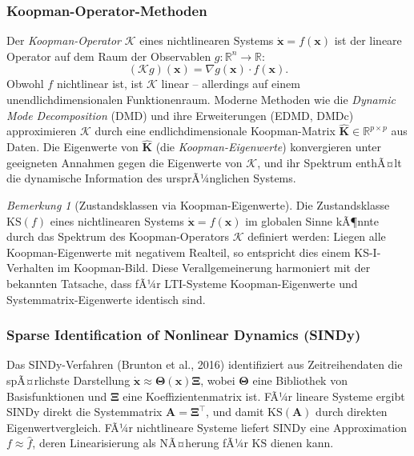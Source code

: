 ﻿\documentclass[12pt, a4paper, titlepage]{report}
\theoremstyle{definition}
\theoremstyle{remark}
\newtheorem{remark}[theorem]{Bemerkung}
\newcommand{\R}{\mathbb{R}}
\newcommand{\vx}{\bm{x}}
\newcommand{\vA}{\bm{A}}
\newcommand{\vK}{\bm{K}}
\newcommand{\T}{\top}
\newcommand{\KS}{\mathrm{KS}}
\begin{document}
\subsubsection*{Koopman-Operator-Methoden}

Der \emph{Koopman-Operator} $\mathcal{K}$ eines nichtlinearen Systems
$\dot{\vx} = f(\vx)$ ist der lineare Operator auf dem Raum der Observablen
$g : \R^n \to \R$:
\begin{equation}
  (\mathcal{K} g)(\vx) = \nabla g(\vx) \cdot f(\vx).
  \label{eq:koopman}
\end{equation}
Obwohl $f$ nichtlinear ist, ist $\mathcal{K}$ linear -- allerdings auf einem
unendlichdimensionalen Funktionenraum. Moderne Methoden wie die \emph{Dynamic Mode
Decomposition} (DMD) und ihre Erweiterungen (EDMD, DMDc) approximieren $\mathcal{K}$
durch eine endlichdimensionale Koopman-Matrix $\hat{\vK} \in \R^{p \times p}$
aus Daten. Die Eigenwerte von $\hat{\vK}$ (die \emph{Koopman-Eigenwerte}) konvergieren
unter geeigneten Annahmen gegen die Eigenwerte von $\mathcal{K}$, und ihr Spektrum
enthÃ¤lt die dynamische Information des ursprÃ¼nglichen Systems.

\begin{remark}[Zustandsklassen via Koopman-Eigenwerte]
Die Zustandsklasse $\KS(f)$ eines nichtlinearen Systems $\dot{\vx} = f(\vx)$ im globalen
Sinne kÃ¶nnte durch das Spektrum des Koopman-Operators $\mathcal{K}$ definiert werden:
Liegen alle Koopman-Eigenwerte mit negativem Realteil, so entspricht dies einem
KS-I-Verhalten im Koopman-Bild. Diese Verallgemeinerung harmoniert mit der
bekannten Tatsache, dass fÃ¼r LTI-Systeme Koopman-Eigenwerte und Systemmatrix-Eigenwerte
identisch sind.
\end{remark}

\subsubsection*{Sparse Identification of Nonlinear Dynamics (SINDy)}

Das SINDy-Verfahren (Brunton et al., 2016) identifiziert aus Zeitreihendaten die
spÃ¤rlichste Darstellung $\dot{\vx} \approx \bm{\Theta}(\vx)\bm{\Xi}$, wobei
$\bm{\Theta}$ eine Bibliothek von Basisfunktionen und $\bm{\Xi}$ eine Koeffizientenmatrix
ist. FÃ¼r lineare Systeme ergibt SINDy direkt die Systemmatrix $\vA = \bm{\Xi}^\T$,
und damit $\KS(\vA)$ durch direkten Eigenwertvergleich. FÃ¼r nichtlineare Systeme
liefert SINDy eine Approximation $f \approx \hat{f}$, deren Linearisierung als
NÃ¤herung fÃ¼r $\KS$ dienen kann.
\end{document}
